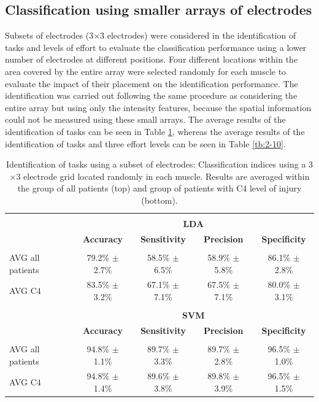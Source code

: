 \subsection{Classification using smaller arrays of electrodes}
Subsets of electrodes (3$\times$3 electrodes) were considered in the identification of tasks and levels of effort to evaluate the classification performance using a lower number of electrodes at different positions. Four different locations within the area covered by the entire array were selected randomly for each muscle to evaluate the impact of their placement on the identification performance. The identification was carried out following the same procedure as considering the entire array but using only the intensity features, because the spatial information could not be measured using these small arrays. The average results of the identification of tasks can be seen in Table \ref{2-9}, whereas the average results of the identification of tasks and three effort levels can be seen in Table \ref{tb:2-10}.

\begin{table}[]
\centering
\caption{Identification of tasks using a subset of electrodes: Classification indices using a 3$\times$3 electrode grid located randomly in each muscle. Results are averaged within the group of all patients (top) and group of patients with C4 level of injury (bottom).}
\label{2-9}
\begin{tabular}{lcccc}
 & & & &\\
                 & \multicolumn{4}{c}{\large{\textbf{LDA}}}                                                      \\
                 & \textbf{Accuracy}  & \textbf{Sensitivity} & \textbf{Precision} & \textbf{Specificity} \\ \hline
                 &                    &                      &                    &                      \\
AVG all patients & 79.2\% $\pm$ 2.7\% & 58.5\% $\pm$ 6.5\%   & 58.9\% $\pm$ 5.8\% & 86.1\% $\pm$ 2.8\%   \\
AVG C4           & 83.5\% $\pm$ 3.2\% & 67.1\% $\pm$ 7.1\%   & 67.5\% $\pm$ 7.1\% & 80.0\% $\pm$ 3.1\%   \\
                 &                    &                      &                    &                      \\
                 & \multicolumn{4}{c}{\large{\textbf{SVM}}}                                                      \\
                 & \textbf{Accuracy}  & \textbf{Sensitivity} & \textbf{Precision} & \textbf{Specificity} \\ \hline
                 &                    &                      &                    &                      \\
AVG all patients & 94.8\% $\pm$ 1.1\% & 89.7\% $\pm$ 3.3\%   & 89.7\% $\pm$ 2.8\% & 96.5\% $\pm$ 1.0\%   \\
AVG C4           & 94.8\% $\pm$ 1.4\% & 89.6\% $\pm$ 3.8\%   & 89.8\% $\pm$ 3.9\% & 96.5\% $\pm$ 1.5\%  
\end{tabular}
\end{table}

